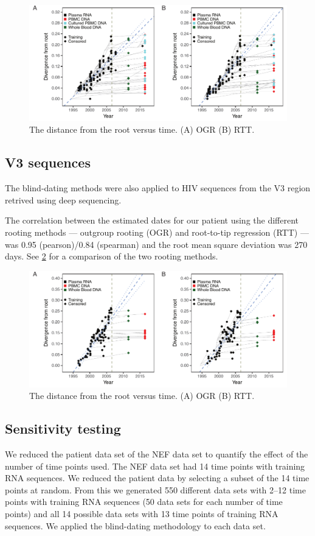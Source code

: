 \documentclass[9pt,twocolumn,twoside,lineno]{pnas-new}
\begin{document}
\begin{figure}
\includegraphics{nefdistvtime}
\caption{The distance from the root versus time.
(A) OGR (B) RTT.}
\label{fig:nefdistvtime}
\end{figure}

\subsection*{V3 sequences}
The blind-dating methods were also applied to HIV sequences from the V3 region retrived using deep sequencing.

The correlation between the estimated dates for our patient using the different rooting methods --- outgroup rooting (OGR) and root-to-tip regression (RTT) --- was 0.95 (pearson)/0.84 (spearman) and the root mean square deviation was 270 days.
See \cref{fig:v3distvtime} for a comparison of the two rooting methods.

\begin{figure}
\includegraphics{v3distvtime}
\caption{The distance from the root versus time.
(A) OGR (B) RTT.}
\label{fig:v3distvtime}
\end{figure}

\subsection*{Sensitivity testing}
We reduced the patient data set of the NEF data set to quantify the effect of the number of time points used.
The NEF data set had 14 time points with training RNA sequences.
We reduced the patient data by selecting a subset of the 14 time points at random.
From this we generated 550 different data sets with 2--12 time points with training RNA sequences (50 data sets for each number of time points) and all 14 possible data sets with 13 time points of training RNA sequences.
We applied the blind-dating methodology to each data set.
\end{document}
